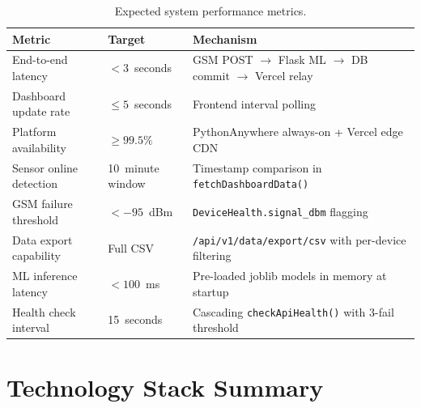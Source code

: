 \documentclass[12pt,a4paper]{article}
\begin{document}
\begin{table}[H]
\centering
\caption{Expected system performance metrics.}
\label{tab:sysperf}
\begin{tabular}{@{}lll@{}}
\toprule
\textbf{Metric} & \textbf{Target} & \textbf{Mechanism} \\
\midrule
End-to-end latency & $< 3$~seconds & GSM POST $\rightarrow$ Flask ML $\rightarrow$ DB commit $\rightarrow$ Vercel relay \\
Dashboard update rate & $\leq 5$~seconds & Frontend interval polling \\
Platform availability & $\geq 99.5\%$ & PythonAnywhere always-on + Vercel edge CDN \\
Sensor online detection & 10~minute window & Timestamp comparison in \texttt{fetchDashboardData()} \\
GSM failure threshold & $< -95$~dBm & \texttt{DeviceHealth.signal\_dbm} flagging \\
Data export capability & Full CSV & \texttt{/api/v1/data/export/csv} with per-device filtering \\
ML inference latency & $< 100$~ms & Pre-loaded joblib models in memory at startup \\
Health check interval & 15~seconds & Cascading \texttt{checkApiHealth()} with 3-fail threshold \\
\bottomrule
\end{tabular}
\end{table}

\section{Technology Stack Summary}
\end{document}
